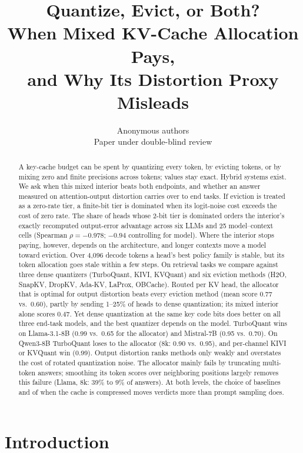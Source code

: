 \documentclass{article}
\title{Quantize, Evict, or Both?\\
When Mixed KV-Cache Allocation Pays,\\
and Why Its Distortion Proxy Misleads}
\author{Anonymous authors \\ Paper under double-blind review}
\theoremstyle{definition}
\begin{document}
\maketitle

\begin{abstract}
A key-cache budget can be spent by quantizing every token, by evicting tokens, or by mixing zero and finite precisions across tokens; values stay exact.  Hybrid systems exist.  We ask when this mixed interior beats both endpoints, and whether an answer measured on attention-output distortion carries over to end tasks.  If eviction is treated as a zero-rate tier, a finite-bit tier is dominated when its logit-noise cost exceeds the cost of zero rate.  The share of heads whose 2-bit tier is dominated orders the interior's exactly recomputed output-error advantage across six LLMs and 25 model--context cells (Spearman $\rho=-0.978$; $-0.94$ controlling for model).  Where the interior stops paying, however, depends on the architecture, and longer contexts move a model toward eviction.  Over 4,096 decode tokens a head's best policy family is stable, but its token allocation goes stale within a few steps.  On retrieval tasks we compare against three dense quantizers (TurboQuant, KIVI, KVQuant) and six eviction methods (H2O, SnapKV, DropKV, Ada-KV, LaProx, OBCache).  Routed per KV head, the allocator that is optimal for output distortion beats every eviction method (mean score 0.77 vs.\ 0.60), partly by sending 1--25\% of heads to dense quantization; its mixed interior alone scores 0.47.
Yet dense quantization at the same key code bits does better on all three end-task models, and the best quantizer depends on the model.  TurboQuant wins on Llama-3.1-8B (0.99 vs.\ 0.65 for the allocator) and Mistral-7B (0.95 vs.\ 0.70).  On Qwen3-8B TurboQuant loses to the allocator (8k: 0.90 vs.\ 0.95), and per-channel KIVI or KVQuant win (0.99).  Output distortion ranks methods only weakly and overstates the cost of rotated quantization noise.  The allocator mainly fails by truncating multi-token answers; smoothing its token scores over neighboring positions largely removes this failure (Llama, 8k: 39\% to 9\% of answers).  At both levels, the choice of baselines and of when the cache is compressed moves verdicts more than prompt sampling does.
\end{abstract}

\section{Introduction}
\label{sec:intro}
\end{document}
